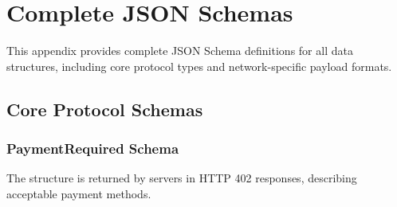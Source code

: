 \chapter{Complete JSON Schemas}
\label{app:schemas}

This appendix provides complete JSON Schema definitions for all \tprotocol{} data structures, including core protocol types and network-specific payload formats.

\section{Core Protocol Schemas}

\subsection{PaymentRequired Schema}

The  structure is returned by servers in HTTP 402 responses, describing acceptable payment methods.

